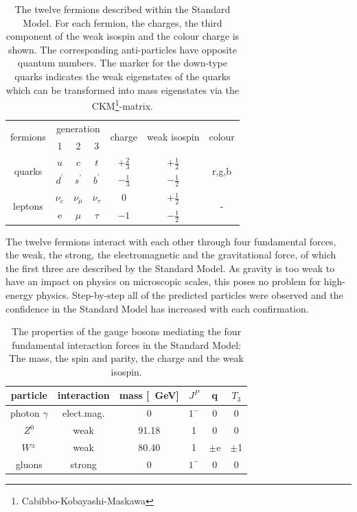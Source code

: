 \begin{table}[htb]
\centering
\begin{tabular}{c c c c c c c } \toprule
\multirow{2}{*}{fermions} & \multicolumn{3}{c}{generation} & \multirow{2}{*}{charge} & \multirow{2}{*}{weak isospin} &
\multirow{2}{*}{colour}\\ 
& 1 & 2 & 3 & & & \\ \midrule
\multirow{2}{*}{quarks} & $u$ & $c$ & $t$ & $+ \frac{2}{3}$ & $+ \frac{1}{2}$ & \multirow{2}{*}{r,g,b}\\
& $d^\prime$ & $s^\prime$ & $b^\prime$ & $- \frac{1}{3}$ & $- \frac{1}{2}$ &\\ \midrule
\multirow{2}{*}{leptons} & $\nu_e$ & $\nu_\mu$ & $\nu_\tau$ & 0 & $+ \frac{1}{2}$ & \multirow{2}{*}{-}\\
& e & $\mu$ & $\tau$ & $-1$  & $- \frac{1}{2}$ &\\ \bottomrule
\end{tabular}
\caption[Particles of the Standard Model]{The twelve fermions described within the Standard Model. For each fermion, the charges, the third component of the weak isospin and the colour charge is shown. The corresponding anti-particles have opposite quantum numbers. The marker for the down-type quarks indicates the weak eigenstates of the quarks which can be transformed into mass eigenstates via the CKM\footnote{Cabibbo-Kobayashi-Maskawa}-matrix.}
\end{table}


The twelve fermions interact with each other through four fundamental forces,
the weak, the strong, the electromagnetic and the gravitational force, of which
the first three are described by the Standard Model. As gravity is too weak to
have an impact on physics on microscopic scales, this poses no problem for
high-energy physics. Step-by-step all of the predicted particles were observed
and the confidence in the Standard Model has increased with each confirmation.

\begin{table}[htb]
\centering
\begin{tabular}{c c c c c c} \toprule
particle & interaction & mass [\SI{}{\giga \electronvolt}] & $J^P$ & q & $T_3$\\\midrule
photon $\gamma$ & elect.mag. & 0  & $1^-$ & 0  & 0\\
$Z^0$ & weak & 91.18 & 1 & 0 & 0\\
$W^\pm$ & weak & 80.40 & 1 & $\pm$e & $\pm$1\\
gluons & strong & 0 & $1^-$ & 0 & 0\\\bottomrule
\end{tabular}
\caption[The gauge bosons and their properties]{The properties of the gauge bosons mediating the four fundamental interaction forces in the Standard Model: The mass, the spin and parity, the charge and the weak isospin.}
\end{table}

